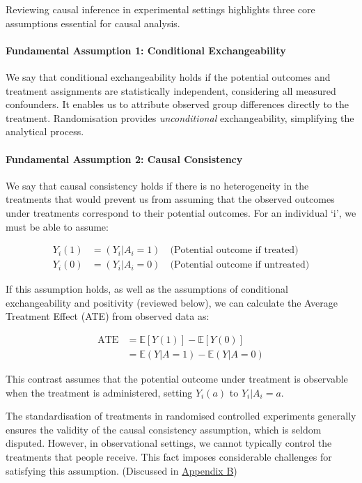 \documentclass[
  singlecolumn]{article}
\let\oldparagraph\paragraph
\renewcommand{\paragraph}[1]{\oldparagraph{#1}\mbox{}}
\begin{document}
Reviewing causal inference in experimental settings highlights three
core assumptions essential for causal analysis.

\paragraph{Fundamental Assumption 1: Conditional
Exchangeability}\label{fundamental-assumption-1-conditional-exchangeability}

We say that conditional exchangeability holds if the potential outcomes
and treatment assignments are statistically independent, considering all
measured confounders. It enables us to attribute observed group
differences directly to the treatment. Randomisation provides
\emph{unconditional} exchangeability, simplifying the analytical
process.

\paragraph{Fundamental Assumption 2: Causal
Consistency}\label{fundamental-assumption-2-causal-consistency}

We say that causal consistency holds if there is no heterogeneity in the
treatments that would prevent us from assuming that the observed
outcomes under treatments correspond to their potential outcomes. For an
individual `i', we must be able to assume:

\[
\begin{aligned}
Y_{i}(1) &= (Y_{i}|A_{i} = 1) \quad \text{(Potential outcome if treated)} \\
Y_{i}(0) &= (Y_{i}|A_{i} = 0) \quad \text{(Potential outcome if untreated)}
\end{aligned}
\]

If this assumption holds, as well as the assumptions of conditional
exchangeability and positivity (reviewed below), we can calculate the
Average Treatment Effect (ATE) from observed data as:

\[
\begin{aligned}
\text{ATE} &= \mathbb{E}[Y(1)] - \mathbb{E}[Y(0)] \\
&= \mathbb{E}(Y|A=1) - \mathbb{E}(Y|A=0)
\end{aligned}
\]

This contrast assumes that the potential outcome under treatment is
observable when the treatment is administered, setting \(Y_i(a)\) to
\(Y_i|A_i=a\).

The standardisation of treatments in randomised controlled experiments
generally ensures the validity of the causal consistency assumption,
which is seldom disputed. However, in observational settings, we cannot
typically control the treatments that people receive. This fact imposes
considerable challenges for satisfying this assumption. (Discussed in
\hyperref[appendix-b]{Appendix B})
\end{document}
